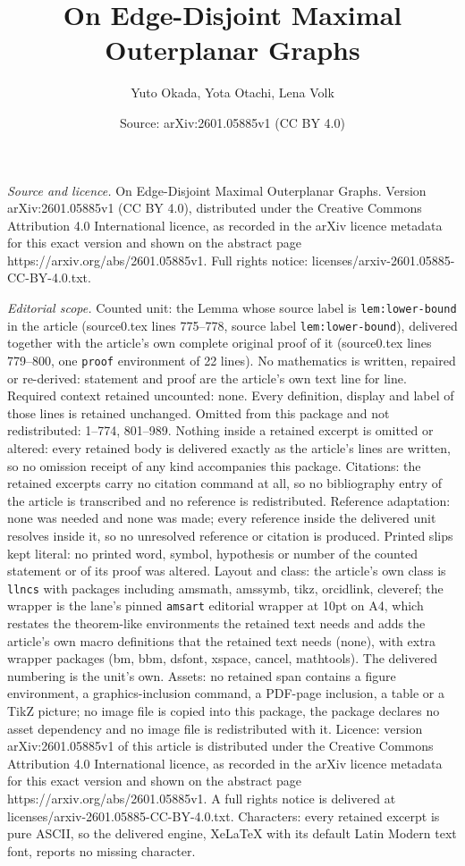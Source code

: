 \documentclass[10pt,a4paper]{amsart}
\title[On Edge-Disjoint Maximal Outerplanar Graphs]{On Edge-Disjoint Maximal Outerplanar Graphs}
\author{Yuto Okada, Yota Otachi, Lena Volk}
\date{Source: arXiv:2601.05885v1 (CC BY 4.0)}
\begin{document}
\maketitle

\noindent\emph{Source and licence.} On Edge-Disjoint Maximal Outerplanar Graphs. Version arXiv:2601.05885v1 (CC BY 4.0), distributed under the Creative Commons Attribution 4.0 International licence, as recorded in the arXiv licence metadata for this exact version and shown on the abstract page https://arxiv.org/abs/2601.05885v1. Full rights notice: licenses/arxiv-2601.05885-CC-BY-4.0.txt.\par\smallskip

\noindent\textit{Editorial scope.} Counted unit: the Lemma whose source label is \texttt{lem:lower-bound} in the article (source0.tex lines 775--778, source label \texttt{lem:lower-bound}), delivered together with the article's own complete original proof of it (source0.tex lines 779--800, one \texttt{proof} environment of 22 lines). No mathematics is written, repaired or re-derived: statement and proof are the article's own text line for line. Required context retained uncounted: none. Every definition, display and label of those lines is retained unchanged. Omitted from this package and not redistributed: 1--774, 801--989. Nothing inside a retained excerpt is omitted or altered: every retained body is delivered exactly as the article's lines are written, so no omission receipt of any kind accompanies this package. Citations: the retained excerpts carry no citation command at all, so no bibliography entry of the article is transcribed and no reference is redistributed. Reference adaptation: none was needed and none was made; every reference inside the delivered unit resolves inside it, so no unresolved reference or citation is produced. Printed slips kept literal: no printed word, symbol, hypothesis or number of the counted statement or of its proof was altered. Layout and class: the article's own class is \texttt{llncs} with packages including amsmath, amssymb, tikz, orcidlink, cleveref; the wrapper is the lane's pinned \texttt{amsart} editorial wrapper at 10pt on A4, which restates the theorem-like environments the retained text needs and adds the article's own macro definitions that the retained text needs (none), with extra wrapper packages (bm, bbm, dsfont, xspace, cancel, mathtools). The delivered numbering is the unit's own. Assets: no retained span contains a figure environment, a graphics-inclusion command, a PDF-page inclusion, a table or a TikZ picture; no image file is copied into this package, the package declares no asset dependency and no image file is redistributed with it. Licence: version arXiv:2601.05885v1 of this article is distributed under the Creative Commons Attribution 4.0 International licence, as recorded in the arXiv licence metadata for this exact version and shown on the abstract page https://arxiv.org/abs/2601.05885v1. A full rights notice is delivered at licenses/arxiv-2601.05885-CC-BY-4.0.txt. Characters: every retained excerpt is pure ASCII, so the delivered engine, XeLaTeX with its default Latin Modern text font, reports no missing character.
\end{document}
